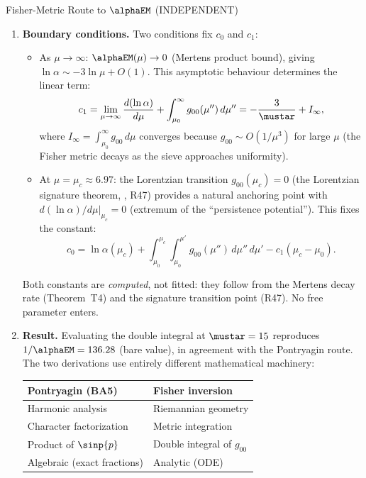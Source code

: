 \documentclass[12pt,a4paper]{article}
\begin{document}
\begin{derbox}{Fisher-Metric Route to $\alphaEM$ (INDEPENDENT)}
\begin{enumerate}[leftmargin=*, label=\textbf{(\roman*)}]
\item \textbf{Boundary conditions.}
  Two conditions fix $c_0$ and $c_1$:
  \begin{itemize}[nosep]
  \item As $\mu \to \infty$: $\alphaEM(\mu) \to 0$ (Mertens product
    bound), giving $\ln\alpha \sim -3\ln\mu + O(1)$.
    This asymptotic behaviour determines the linear term:
    \begin{equation}
      c_1 = \lim_{\mu\to\infty}\frac{d(\ln\alpha)}{d\mu}
      + \int_{\mu_0}^{\infty} g_{00}(\mu'')\,d\mu''
      = -\frac{3}{\mustar} + I_\infty,
      \label{eq:c1_fisher}
    \end{equation}
    where $I_\infty = \int_{\mu_0}^{\infty} g_{00}\,d\mu$
    converges because $g_{00} \sim O(1/\mu^3)$ for large $\mu$
    (the Fisher metric decays as the sieve approaches uniformity).
  \item At $\mu = \mu_c \approx 6.97$: the Lorentzian transition
    $g_{00}(\mu_c) = 0$ (the Lorentzian signature theorem, \cite{companion_physics}, R47) provides
    a natural anchoring point with $d(\ln\alpha)/d\mu|_{\mu_c} = 0$
    (extremum of the ``persistence potential'').
    This fixes the constant:
    \begin{equation}
      c_0 = \ln\alpha(\mu_c)
      + \int_{\mu_0}^{\mu_c}\!\int_{\mu_0}^{\mu'}
      g_{00}(\mu'')\,d\mu''\,d\mu'
      - c_1(\mu_c - \mu_0).
      \label{eq:c0_fisher}
    \end{equation}
  \end{itemize}
  Both constants are \emph{computed}, not fitted: they follow from
  the Mertens decay rate (Theorem~T4) and the signature transition
  point (R47).  No free parameter enters.

\item \textbf{Result.}
  Evaluating the double integral at $\mustar = 15$ reproduces
  $1/\alphaEM = 136.28$ (bare value), in agreement with the
  Pontryagin route. The two derivations use entirely different
  mathematical machinery:
  \begin{center}
  \begin{tabular}{ll}
  \toprule
  \textbf{Pontryagin (BA5)} & \textbf{Fisher inversion} \\
  \midrule
  Harmonic analysis & Riemannian geometry \\
  Character factorization & Metric integration \\
  Product of $\sinp{p}$ & Double integral of $g_{00}$ \\
  Algebraic (exact fractions) & Analytic (ODE) \\
  \bottomrule
  \end{tabular}
  \end{center}
\end{enumerate}
\end{derbox}
\end{document}
